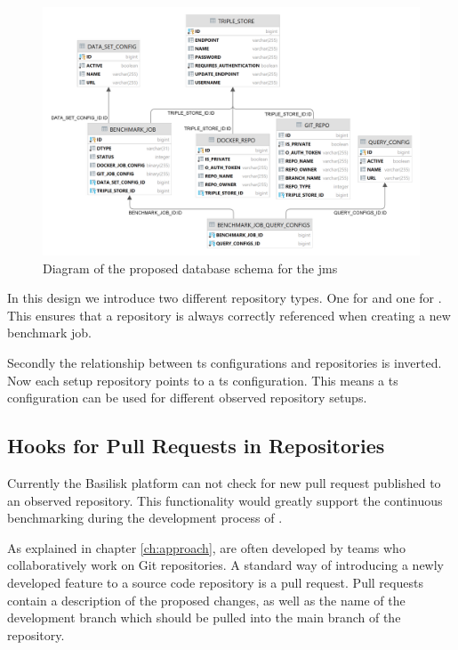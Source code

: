 \begin{figure}[tbph]
	\centering
	\includegraphics[width=.95\textwidth]{figures/jms_db_schema_design.png}
	\caption{Diagram of the proposed database schema for the \ac{jms}}
	\label{fig:design_jms_db_schema}
\end{figure}

In this design we introduce two different repository types.
One for \gh{} and one for \dockh{}.
This ensures that a repository is always correctly referenced when creating a new benchmark job.

Secondly the relationship between \ac{ts} configurations and repositories is inverted. 
Now each setup repository points to a \ac{ts} configuration.
This means a \ac{ts} configuration can be used for different observed repository setups.



\subsection{Hooks for Pull Requests in \gh{} Repositories}
Currently the Basilisk platform can not check for new pull request published to an observed repository.
This functionality would greatly support the continuous benchmarking during the development process of \tsp{}.

As explained in chapter \ref{ch:approach}, \tsp{} are often developed by teams who collaboratively work on Git repositories.
A standard way of introducing a newly developed feature to a source code repository is a pull request.
Pull requests contain a description of the proposed changes, as well as the name of the development branch which should be pulled into the main branch of the repository.

